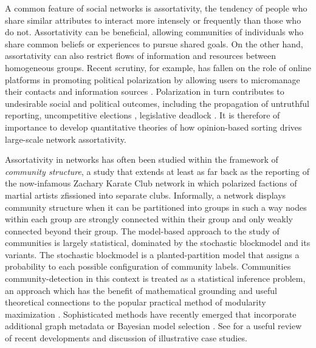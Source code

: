 \documentclass[review, onefignum, onetabnum]{siamart171218}
\begin{document}
	A common feature of social networks is assortativity, the tendency of people who share similar attributes to interact more intensely or frequently than those who do not.
	Assortativity can be beneficial, allowing communities of individuals who share common beliefs or experiences to pursue shared goals. 
	On the other hand, assortativity can also restrict flows of information and resources between homogeneous groups. 
	Recent scrutiny, for example, has fallen on the role of online platforms in promoting political polarization by allowing users to micromanage their contacts and information sources \cite{Bakshy2015,Anagnostopoulos2014}. 
	Polarization in turn contributes to undesirable social and political outcomes, including the propagation of untruthful reporting\cite{Lazer2018}, uncompetitive elections \cite{Abramowitz2006}, legislative deadlock \cite{Layman2006}. 
	It is therefore of importance to develop quantitative theories of how opinion-based sorting drives large-scale network assortativity. 

	Assortativity in networks has often been studied within the framework of \emph{community structure}, a study that extends at least as far back as the reporting of the now-infamous Zachary Karate Club network \cite{Zachary1977} in which polarized factions of martial artists zfissioned into separate clubs.  
	Informally, a network displays community structure when it can be partitioned into groups in such a way nodes within each group are strongly connected within their group and only weakly connected beyond their group. 
	The model-based approach to the study of communities is largely statistical, dominated by the stochastic blockmodel and its variants.  
	The stochastic blockmodel is a planted-partition model that assigns a probability to each possible configuration of community labels. 
	Communities community-detection in this context is treated as a statistical inference problem, an approach which has the benefit of  mathematical grounding and useful theoretical connections to the popular practical method of modularity maximization \cite{Newman2016a}. 
	Sophisticated methods have recently emerged that incorporate additional graph metadata \cite{Peel2016,Newman2016b} or Bayesian model selection \cite{Peixoto2017a,Peixoto2017d}. 
	See \cite{Shai2017} for a useful review of recent developments and discussion of illustrative case studies. 
\end{document}
